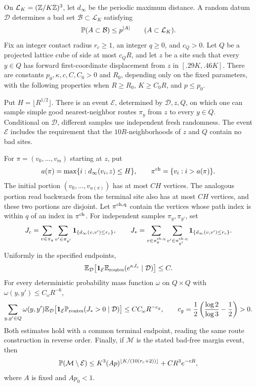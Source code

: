 \begin{proposition}
\label{prop:route-input}
On $\mathcal L_K=(\mathbb Z/K\mathbb Z)^3$, let $d_\infty$ be the periodic maximum
distance.  A random datum $\mathcal D$ determines a bad set
$\mathcal B\subset\mathcal L_K$ satisfying
\[
 \mathbb P(A\subset\mathcal B)\le p^{|A|}\qquad(A\subset\mathcal L_K).
\]
Fix an integer contact radius $r_c\ge1$, an integer $q\ge0$, and $c_Q>0$.
Let $Q$ be a projected lattice cube of side at most $c_QR$, and let
$z$ be a site such that every $y\in Q$ has forward first-coordinate
displacement from $z$ in $[.29K,.46K]$.  There are constants
$p_0,\kappa,c,C,C_0>0$ and $R_0$, depending only on the fixed
parameters, with the following properties when $R\ge R_0$,
$K\ge C_0R$, and $p\le p_0$.

Put $H=\lfloor R^{1/2}\rfloor$.  There is an event $\mathcal E$,
determined by $\mathcal D,z,Q$, on which one can sample simple good
nearest-neighbor routes $\pi_y$ from $z$ to every $y\in Q$.
Conditional on $\mathcal D$, different samples use independent fresh
randomness.  The event $\mathcal E$ includes the requirement that the
$10R$-neighborhoods of $z$ and $Q$ contain no bad sites.

For $\pi=(v_0,\ldots,v_m)$ starting at $z$, put
\[
 a(\pi)=\max\{i:d_\infty(v_i,z)\le H\},\qquad
 \pi^{\rm ch}=\{v_i:i>a(\pi)\}.
\]
The initial portion $(v_0,\ldots,v_{a(\pi)})$ has at most $CH$
vertices.  The analogous portion read backwards from the terminal
site also has at most $CH$ vertices, and these two portions are
disjoint.  Let $\pi^{\rm ch,q}$ contain the vertices whose path index
is within $q$ of an index in $\pi^{\rm ch}$.  For independent samples
$\pi_y,\pi_{y'}$, set
\[
 J_c=\sum_{v\in\pi_y}\sum_{v'\in\pi_{y'}}
       \mathbf 1_{\{d_\infty(v,v')\le r_c\}},\qquad
 J_*=\sum_{v\in\pi_y^{\rm ch,q}}
       \sum_{v'\in\pi_{y'}^{\rm ch,q}}
       \mathbf 1_{\{d_\infty(v,v')\le r_c\}}.
\]
Uniformly in the specified endpoints,
\begin{equation}\label{eq:route-exponential}
 \mathbb E_{\mathcal D}\bigl[\mathbf 1_{\mathcal E}
       \mathbb E_{\rm routes}(e^{\kappa J_c}\mid\mathcal D)\bigr]\le C.
\end{equation}
For every deterministic probability mass function $\omega$ on
$Q\times Q$ with $\omega(y,y')\le C_\omega R^{-6}$,
\begin{equation}\label{eq:route-rare}
 \sum_{y,y'\in Q}\omega(y,y')
   \mathbb E_{\mathcal D}\bigl[\mathbf 1_{\mathcal E}
       \mathbb P_{\rm routes}(J_*>0\mid\mathcal D)\bigr]
 \le CC_\omega R^{-c_g},\qquad
 c_g=\frac12\left(\frac{\log2}{\log3}-\frac12\right)>0.
\end{equation}
Both estimates hold with a common terminal endpoint, reading the same
route construction in reverse order.  Finally, if $\mathcal M$ is
the stated bad-free margin event, then
\begin{equation}\label{eq:route-rejection}
 \mathbb P(\mathcal M\setminus\mathcal E)
 \le K^3(Ap)^{\lfloor K/(10(r_c+2))\rfloor}+CR^3e^{-cR},
\end{equation}
where $A$ is fixed and $Ap_0<1$.
\end{proposition}

